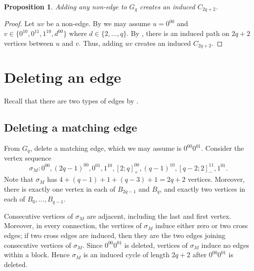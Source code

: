 \documentclass[11pt]{article}
\newtheorem{proposition}[theorem]{Proposition}
\theoremstyle{definition}
\theoremstyle{remark}
\begin{document}
\begin{proposition}\label{prop:add}
Adding any non-edge to $G_q$ creates an induced $C_{2q+2}$.
\end{proposition}

\begin{proof}
Let $uv$ be a non-edge. 
By  we may assume $u=0^{00}$ and $v\in\{0^{10}, 0^{11}, 1^{10}, d^{00}\}$ where $d\in\{2, \ldots, q\}$. 
By , there is an induced path on $2q+2$ vertices between $u$ and $v$.  
Thus, adding $uv$ creates an induced $C_{2q+2}$.
\end{proof}


\section{Deleting an edge}
\label{sec:deleteedge}

Recall that there are two types of edges by .

\subsection*{Deleting a matching edge}

From $G_q$, delete a matching edge, which we may assume is $0^{00}0^{01}$.  
Consider the vertex sequence 
\begin{equation}
\sigma_M:
  0^{00},(2q-1)^{00},0^{01},1^{10},
  [2;q]_{+}^{00},(q-1)^{10},[q-2;2]_{-}^{11},1^{01}. 
\label{eq:deleteM}
\end{equation}
Note that $\sigma_M$ has  $4+(q-1)+1+(q-3)+1=2q+2$ vertices.
Moreover, there is exactly one vertex in each of $B_{2q-1}$ and $B_q$, and exactly two vertices in each of $B_0, \ldots, B_{q-1}$.

Consecutive vertices of $\sigma_M$ are adjacent, including the last and first vertex.
Moreover, in every connection, the vertices of $\sigma_M$ induce either zero or two cross edges; if two cross edges are induced, then they are the two edges joining consecutive vertices of $\sigma_M$.
Since $0^{00}0^{01}$ is deleted,  vertices of $\sigma_M$ induce no edges within a block.
Hence $\sigma_M$ is an induced cycle of length $2q+2$ after $0^{00}0^{01}$ is deleted.
\end{document}
